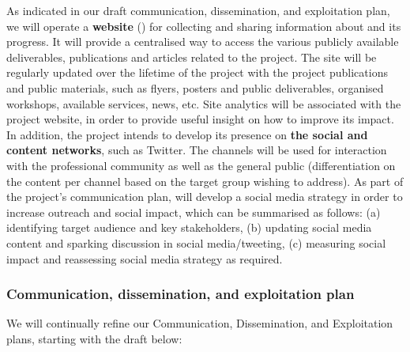 As indicated in our draft communication, dissemination, and exploitation plan, we will operate a \textbf{website}
() for collecting and sharing information about \TheProject and its progress.
It will provide a centralised way to access the various publicly available deliverables, publications
and articles related to the project. The site will be regularly updated over the lifetime of the project
with the project publications and public materials, such as flyers, posters and
public deliverables, organised workshops, available services, news, etc.
Site analytics will be associated with the project website, in order
to provide useful insight on how to improve its impact. In addition, the project intends to
develop its presence on \textbf{the social and content
networks}, such as Twitter. The channels will be used for interaction
with the professional community as well as the general public
(differentiation on the content per channel based on the target group wishing to address).
As part of the project's communication plan, \TheProject will develop a social media strategy
in order to increase outreach and social impact, which can be summarised as follows: (a) identifying target
audience and key stakeholders, (b) updating social media content and sparking
discussion in social media/tweeting, (c) measuring social impact and reassessing
social media strategy as required.

\subsubsection{Communication, dissemination, and exploitation plan}

We will continually refine our Communication, Dissemination, and Exploitation plans, starting with the draft below:

